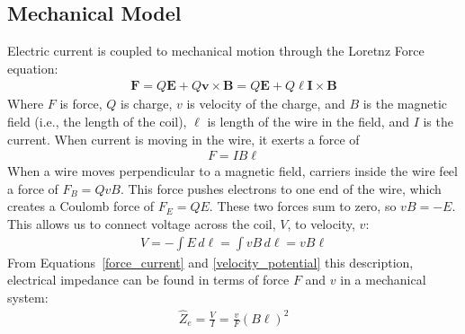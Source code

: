 \documentclass[10pt,letterpaper]{book}
\begin{document}
\subsection{Mechanical Model}\label{mechanical_section}
Electric current is coupled to mechanical motion through the Loretnz Force equation:
\begin{align}
\mathbf{F}=Q\mathbf{E}+Q\mathbf{v}\times \mathbf{B}=Q\mathbf{E}+Q\ell\mathbf{I}\times \mathbf{B}
\end{align}
Where $F$ is force, $Q$ is charge, $v$ is velocity of the charge, and $B$ is the magnetic field (i.e., the length of the coil), $\ell$ is length of the wire in the field, and $I$ is the current. When current is moving in the wire, it exerts a force of
\begin{align}
F=IB\ell\label{force_current}
\end{align}
When a wire moves perpendicular to a magnetic field, carriers inside the wire feel a force of $F_B=QvB$. This force pushes electrons to one end of the wire, which creates a Coulomb force of $F_E=QE$. These two forces sum to zero, so $vB=-E$. This allows us to connect voltage across the coil, $V$, to velocity, $v$:
\begin{align}
V=-\int E\,d\ell=\int vB\,d\ell=vB\ell\label{velocity_potential}
\end{align}
From Equations~\ref{force_current} and \ref{velocity_potential} this description, electrical impedance can be found in terms of force $F$ and $v$ in a mechanical system:
\begin{align}
\hat{Z}_e=\frac{V}{I}=\frac{v}{F}\left(B\ell\right)^2
\end{align}
\end{document}
